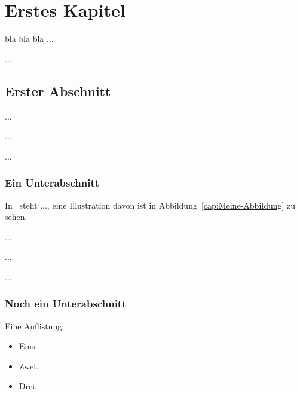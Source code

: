 
\chapter{Erstes Kapitel}
\label{cha:Chapter1}

bla bla bla ...

...



\section{Erster Abschnitt}
\label{sec:Abschnitt1}

...

...

...


\subsection{Ein Unterabschnitt}

In~\cite{Dre2006,LCN2005} steht ..., eine Illustration davon ist in
Abbildung~\ref{cap:Meine-Abbildung} zu sehen.

...

...

...


\subsection{Noch ein Unterabschnitt}

Eine Auflistung:
\begin{itemize}
\item Eins.
\item Zwei.
\item Drei.
\end{itemize}

